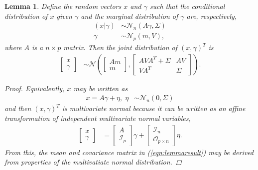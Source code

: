 \documentclass[11pt]{article}
\newtheorem{lemma}[theorem]{Lemma}
\newcommand{\pN}{\mathcal{N}}
\newcommand{\1}{\mathbf{1}}
\newcommand{\0}{\mathbf{0}}
\begin{document}
\begin{lemma}\label{lem:joint}
	Define the random vectors $x$ and $\gamma$ such that the conditional distribution of $x$ given $\gamma$ and the marginal distribution of $\gamma$ are, respectively,
	\begin{align*}
		(x | \gamma) &\sim \pN_n(A\gamma, \Sigma) \\
		\gamma &\sim \pN_p(m, V),
	\end{align*}
	where $A$ is a $n \times p$ matrix. Then the joint distribution of $(x, \gamma)^T$ is 
	\begin{align}
		\begin{bmatrix}
			x \\
			\gamma
		\end{bmatrix} &\sim \pN \left( \begin{bmatrix}
			Am \\
			m
		\end{bmatrix}, \begin{bmatrix}
			AVA^T + \Sigma & AV \\
			VA^T & \Sigma
		\end{bmatrix} \right). \label{eqn:lemmaresult}
	\end{align}
	\begin{proof}
		Equivalently, $x$ may be written as  
		\begin{align*}
			x = A\gamma + \eta,\; \eta &\sim \pN_n(0, \Sigma) 
		\end{align*}
		and then $(x, \gamma)^T$ is multivariate normal because it can be written as an affine transformation of independent multivariate normal variables,
		\begin{align*}
			\begin{bmatrix}
				x \\
				\gamma
			\end{bmatrix} &= \begin{bmatrix}
				A \\ 
				\mathcal{I}_p
			\end{bmatrix} \gamma + \begin{bmatrix}
				\mathcal{I}_n \\
				\mathcal{O}_{p \times n}
			\end{bmatrix} \eta.
		\end{align*}
		From this, the mean and covariance matrix in (\ref{eqn:lemmaresult}) may be derived from properties of the multivatiate normal distribution.
	\end{proof}
\end{lemma} 
\end{document}
